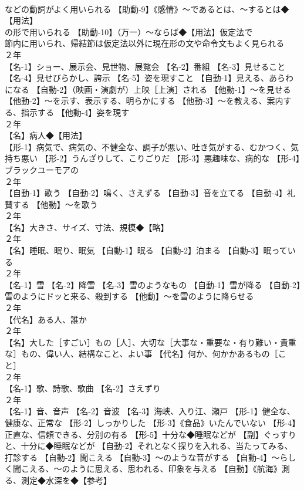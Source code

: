 \documentclass[8pt]{extreport}
\begin{document}
\begin{CJK}{UTF8}{min}
\\	などの動詞がよく用いられる 【助動-9】《感情》～であるとは、～するとは◆【用法】
\\	の形で用いられる 【助動-10】（万一）～ならば◆【用法】仮定法で 
\\	節内に用いられ、帰結節は仮定法以外に現在形の文や命令文もよく見られる
\\	２年	
\\	【名-1】ショー、展示会、見世物、展覧会 【名-2】番組 【名-3】見せること 【名-4】見せびらかし、誇示 【名-5】姿を現すこと 【自動-1】見える、あらわになる 【自動-2】（映画・演劇が）上映［上演］される 【他動-1】～を見せる 【他動-2】～を示す、表示する、明らかにする 【他動-3】～を教える、案内する、指示する 【他動-4】姿を現す
\\	２年	
\\	【名】病人◆【用法】
\\	【形-1】病気で、病気の、不健全な、調子が悪い、吐き気がする、むかつく、気持ち悪い 【形-2】うんざりして、こりごりだ 【形-3】悪趣味な、病的な 【形-4】ブラックユーモアの
\\	２年	
\\	【自動-1】歌う 【自動-2】鳴く、さえずる 【自動-3】音を立てる 【自動-4】礼賛する 【他動】～を歌う
\\	２年	
\\	【名】大きさ、サイズ、寸法、規模◆【略】
\\	２年	
\\	【名】睡眠、眠り、眠気 【自動-1】眠る 【自動-2】泊まる 【自動-3】眠っている
\\	２年	
\\	【名-1】雪 【名-2】降雪 【名-3】雪のようなもの 【自動-1】雪が降る 【自動-2】雪のようにドッと来る、殺到する 【他動】～を雪のように降らせる
\\	２年	
\\	【代名】ある人、誰か
\\	２年	
\\	【名】大した［すごい］もの［人］、大切な［大事な・重要な・有り難い・貴重な］もの、偉い人、結構なこと、よい事 【代名】何か、何かかあるもの［こと］
\\	２年	
\\	【名-1】歌、詩歌、歌曲 【名-2】さえずり
\\	２年	
\\	【名-1】音、音声 【名-2】音波 【名-3】海峡、入り江、瀬戸 【形-1】健全な、健康な、正常な 【形-2】しっかりした 【形-3】《食品》いたんでいない 【形-4】正直な、信頼できる、分別の有る 【形-5】十分な◆睡眠などが 【副】ぐっすりと、十分に◆睡眠などが 【自動-2】それとなく探りを入れる、当たってみる、打診する 【自動-2】聞こえる 【自動-3】～のような音がする 【自動-4】～らしく聞こえる、～のように思える、思われる、印象を与える 【自動】《航海》測る、測定◆水深を◆【参考】

\end{CJK}
\end{document}
